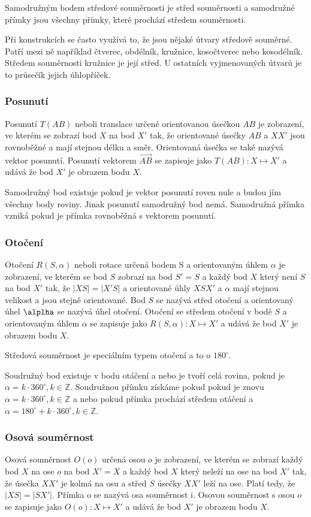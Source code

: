 \documentclass[12pt]{article}
\begin{document}
Samodružným bodem středové souměrnosti je střed souměrnosti a samodružné přímky jsou všechny
přímky, které prochází středem souměrnosti.

Při konstrukcích se často využívá to, že jsou nějaké útvary středově souměrné. Patří mezi ně
například čtverec, obdélník, kružnice, kosočtverec nebo kosodélník. Středem souměrnosti kružnice je
její střed. U ostatních vyjmenovaných útvarů je to průsečík jejich úhlopříček.
\subsubsection*{Posunutí}
Posunutí $T(AB)$ neboli translace určené orientovanou úsečkou $AB$ je zobrazení, ve kterém se zobrazí
bod $X$ na bod $X'$ tak, že orientované úsečky $AB$ a $XX'$ jsou rovnoběžné a mají stejnou délku
a směr. Orientovaná úsečka se také nazývá vektor posunutí. Posunutí vektorem $\vec{AB}$ se zapisuje
jako $T(AB) : X \mapsto X'$ a udává že bod $X'$ je obrazem bodu $X$. 

Samodružný bod existuje pokud je vektor posunutí roven nule a budou jím všechny body roviny. Jinak
posunutí samodružný bod nemá. Samodružná přímka vzniká pokud je přímka rovnoběžná s vektorem posunutí.
\subsubsection*{Otočení}
Otočení $R(S, \alpha)$ neboli rotace určená bodem S a orientovaným úhlem $\alpha$ je zobrazení, ve
kterém se bod $S$ zobrazí na bod $S' = S$ a každý bod $X$ který není $S$ na bod $X'$ tak, že
$|XS| = |X'S|$ a orientované úhly $XSX'$ a $\alpha$ mají stejnou velikost a jsou stejně orientované.
Bod $S$ se nazývá střed otočení a orientovaný úhel $\alplha$ se nazývá úhel otočení. Otočení se
středem otočení v bodě $S$ a orientovaným úhlem $\alpha$ se zapisuje jako $R(S, \alpha) : X \mapsto
X'$ a udává že bod $X'$ je obrazem bodu $X$.

Středová souměrnost je speciálním typem otočení a to o $180^\circ$.

Soudružný bod existuje v bodu otáčení a nebo je tvoří celá rovina, pokud je $\alpha = k \cdot
360^\circ, k \in \mathbb{Z}$. Soudružnou přímku získáme pokud pokud je znovu $\alpha = k \cdot
360^\circ, k \in \mathbb{Z}$ a nebo pokud přímka prochází středem otáčení a $\alpha = 180^\circ + k
\cdot 360^\circ, k \in \mathbb{Z}$.
\subsubsection*{Osová souměrnost}
Osová souměrnost $O(o)$ určená osou $o$ je zobrazení, ve kterém se zobrazí každý bod $X$ na ose $o$
na bod $X' = X$ a každý bod $X$ který neleží na ose na bod $X'$ tak, že úsečka $XX'$ je kolmá na osu
a střed $S$ úsečky $XX'$ leží na ose. Platí tedy, že $|XS| = |SX'|$. Přímka o se nazývá osa souměrnost
i. Osovou souměrnost s osou $o$ se zapisuje jako $O(o) : X \mapsto X'$ a udává že bod $X'$ je obrazem
bodu $X$.
\end{document}
